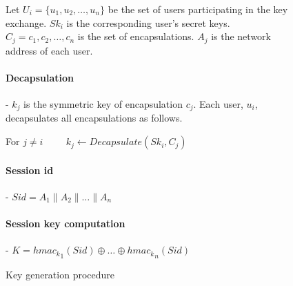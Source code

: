 \begin{figure}[H]
\begin{mdframed}
Let $U_i = \{u_1,u_2,\dots,u_n\}$ be the set of users participating in the key exchange. $Sk_i$ is the corresponding user's secret keys. $C_j = c_1,c_2,\dots,c_n$ is the set of encapsulations. $A_j$ is the network address of each user.
\paragraph{Decapsulation} - $k_j$ is the symmetric key of encapsulation $c_j$. Each user, $u_i$, decapsulates all encapsulations as follows.
\centerline{For $j\neq i \hspace{1cm}   k_j \leftarrow Decapsulate(Sk_i, C_j)$}

\paragraph{Session id} - $Sid = A_1 \parallel A_2 \parallel \dots \parallel A_n$
\paragraph{Session key computation} - $K = {hmac_k}_1(Sid) \oplus \dots \oplus {hmac_k}_n(Sid)$

\caption{Key generation procedure}\label{fig:keygen}
\end{mdframed}
\end{figure}

